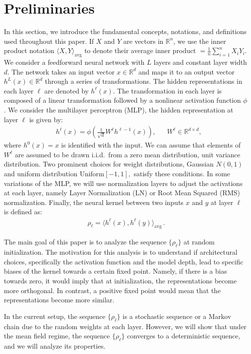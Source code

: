 \documentclass[twoside]{article}
\newcommand{\avg}{\text{avg}}
\theoremstyle{definition}
\begin{document}
\section{Preliminaries}
In this section, we introduce the fundamental concepts, notations, and definitions used throughout this paper. 
If $X$ and $Y$ are vectors in $\mathbb{R}^n$, we use the inner product notation $\langle X, Y \rangle_\avg$ to denote their average inner product $ = \frac{1}{n} \sum_{i=1}^n X_i Y_i.$  We consider a feedforward neural network with $L$ layers and constant layer width $d$. The network takes an input vector $x \in \mathbb{R}^d$ and maps it to an output vector $h^L(x) \in \mathbb{R}^d$ through a series of transformations. The hidden representations in each layer $\ell$ are denoted by $h^\ell(x)$. The transformation in each layer is composed of a linear transformation followed by a nonlinear activation function $\phi$. We consider the multilayer perceptron (MLP), the hidden representation at layer $\ell$ is given by:
\begin{align}
& h^\ell(x) = \phi\left(\frac{1}{\sqrt{d}}W^\ell h^{\ell-1}(x)\right), && W^\ell \in \mathbb{R}^{d \times d},
\end{align}
where $h^0(x)=x$ is identified with the input. We can assume that elements of $W^\ell$ are assumed to be drawn i.i.d.~from a zero mean distribution, unit variance distribution. Two prominent choices for weight distributions, Gaussian $N(0,1)$ and uniform distribution $\text{Uniform}[-1,1],$ satisfy these conditions. In some variations of the MLP, we will use normalization layers to adjust the activations at each layer, namely Layer Normalization (LN) or Root Mean Squared (RMS) normalization. Finally, the neural kernel between two inputs $x$ and $y$ at layer $\ell$ is defined as:
\begin{align}
    \rho_\ell = \langle h^\ell(x), h^\ell(y) \rangle_\avg \,.
\end{align}

The main goal of this paper is to analyze the sequence $\{\rho_\ell\}$ at random initialization. The motivation for this analysis is to understand if architectural choices, specifically the activation function and the model depth, lead to specific biases of the kernel towards a certain fixed point. Namely, if there is a bias towards zero, it would imply that at initialization, the representations become more orthogonal. In contrast, a positive fixed point would mean that the representations become more similar.

In the current setup, the sequence $\{\rho_\ell\}$ is a stochastic sequence or a Markov chain due to the random weights at each layer. However, we will show that under the mean field regime, the sequence $\{\rho_\ell\}$ converges to a deterministic sequence, and we will analyze its properties.
\end{document}
